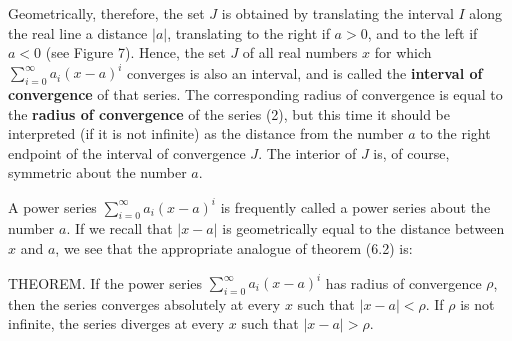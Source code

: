 \noindent Geometrically, therefore, the set $J$ is obtained by translating the interval $I$ along the real line a distance $|a|$, translating to the right if $a > 0$, and to the left if $a < 0$ (see Figure 7). Hence, the set $J$ of all real numbers $x$ for which $\sum_{i=0}^\infty a_{i} (x - a)^i$ converges is also an interval, and is called the \textbf{interval of convergence} of that series. The corresponding radius of convergence is equal to the \textbf{radius of convergence} of the series (2), but this time it should be interpreted (if it is not infinite) as the distance from the number $a$ to the right
endpoint of the interval of convergence $J$. The interior of $J$ is, of course, symmetric about the number $a$.

A power series $\sum_{i=0}^\infty a_{i}(x - a)^i$ is frequently called a power series about the number $a$. If we recall that $|x - a|$ is geometrically equal to the distance between $x$ and $a$, we see that the appropriate analogue of theorem (6.2) is:

\begin{theorem} THEOREM. If the power series $\sum_{i=0}^\infty a_{i} (x - a)^i$ has radius of convergence $\rho$, then the series converges absolutely at every $x$ such that $|x - a| < \rho$. If $\rho$ is not infinite, the series diverges at every $x$ such that $|x - a| > \rho$.
\end{theorem}

